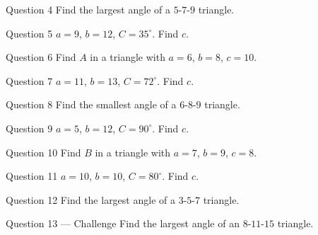 \documentclass[11pt]{article}
\begin{document}
\begin{qbox}{Question 4}
Find the largest angle of a $5$-$7$-$9$ triangle.\workspace{2.4cm}
\end{qbox}

\begin{qbox}{Question 5}
$a=9$, $b=12$, $C=35^\circ$. Find $c$.\workspace{2.4cm}
\end{qbox}

\begin{qbox}{Question 6}
Find $A$ in a triangle with $a=6$, $b=8$, $c=10$.\workspace{2.4cm}
\end{qbox}

\begin{qbox}{Question 7}
$a=11$, $b=13$, $C=72^\circ$. Find $c$.\workspace{2.4cm}
\end{qbox}

\begin{qbox}{Question 8}
Find the smallest angle of a $6$-$8$-$9$ triangle.\workspace{2.4cm}
\end{qbox}

\begin{qbox}{Question 9}
$a=5$, $b=12$, $C=90^\circ$. Find $c$.\workspace{2.2cm}
\end{qbox}

\begin{qbox}{Question 10}
Find $B$ in a triangle with $a=7$, $b=9$, $c=8$.\workspace{2.4cm}
\end{qbox}

\begin{qbox}{Question 11}
$a=10$, $b=10$, $C=80^\circ$. Find $c$.\workspace{2.4cm}
\end{qbox}

\begin{qbox}{Question 12}
Find the largest angle of a $3$-$5$-$7$ triangle.\workspace{2.4cm}
\end{qbox}

\begin{qbox}{Question 13 --- Challenge}
Find the largest angle of an $8$-$11$-$15$ triangle.\workspace{2.8cm}
\end{qbox}

\clearpage
{}
\end{document}
